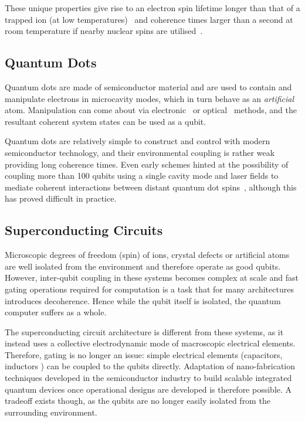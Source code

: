 These unique properties give rise to an electron spin lifetime longer than that of a trapped ion (at low temperatures)~\cite{Jarmola2012} and coherence times larger than a second at room temperature if nearby nuclear spins are utilised~\cite{Maurer2012}.

\subsection{Quantum Dots}
Quantum dots are made of semiconductor material and are used to contain and manipulate electrons in microcavity modes, which in turn behave as an \textit{artificial} atom.
Manipulation can come about via electronic~\cite{Chang1974} or optical~\cite{Dingle1974} methods, and the resultant coherent system states can be used as a qubit.

Quantum dots are relatively simple to construct and control with modern semiconductor technology, and their environmental coupling is rather weak providing long coherence times.
Even early schemes hinted at the possibility of coupling more than 100 qubits using a single cavity mode and laser fields to mediate coherent interactions between distant quantum dot spins~\cite{Imamoglu1999}, although this has proved difficult in practice.

\subsection{Superconducting Circuits}\label{sec:sccircuits}

Microscopic degrees of freedom (\eg spin) of ions, crystal defects or artificial atoms are well isolated from the environment and therefore operate as good qubits.
However, inter-qubit coupling in these systems becomes complex at scale and fast gating operations required for computation is a task that for many architectures introduces decoherence.
Hence while the qubit itself is isolated, the quantum computer suffers as a whole.

The superconducting circuit architecture is different from these systems, as it instead uses a collective electrodynamic mode of macroscopic electrical elements.
Therefore, gating is no longer an issue: simple electrical elements (capacitors, inductors \etc) can be coupled to the qubits directly.
Adaptation of nano-fabrication techniques developed in the semiconductor industry to build scalable integrated quantum devices once operational designs are developed is therefore possible.
A tradeoff exists though, as the qubits are no longer easily isolated from the surrounding environment.

